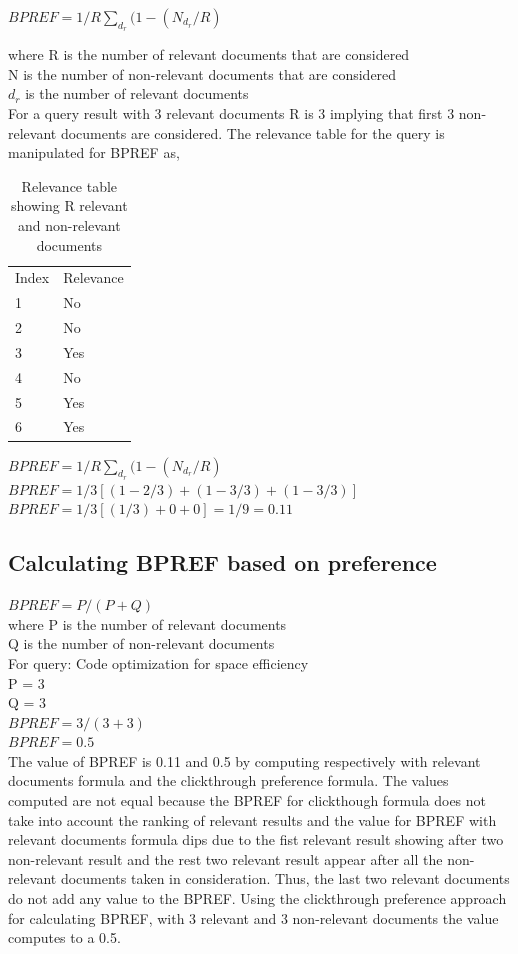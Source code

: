 \documentclass[12pt]{report}
\begin{document}
$BPREF = 1/R \sum\limits_{d_r}^{}(1- ({N_{d_r}} / R)$

where R is the number of relevant documents that are considered\\
N is the number of non-relevant documents that are considered\\
$d_r$ is the number of relevant documents\\
 
For a query result with 3 relevant documents R is 3 implying that first 3 non-relevant documents are considered. The relevance table for the query is manipulated for BPREF as,\\

\begin{table}[]
\centering
\caption{Relevance table showing R relevant and non-relevant documents}
\label{my-label}
\begin{tabular}{ll}
Index & Relevance \\
1     & No       \\
2     & No        \\
3     & Yes        \\
4     & No       \\
5     & Yes        \\
6     & Yes      

\end{tabular}
\end{table}
$BPREF = 1/R \sum\limits_{d_r}^{}(1- ({N_{d_r}} / R)$\\
$BPREF = 1/3[(1-2/3) + (1 - 3/3) + (1- 3/3)]$\\
$BPREF = 1/3 [(1/3) + 0 + 0] = 1/9 = 0.11$

\subsection{Calculating BPREF based on preference}

$BPREF = P /( P + Q)$\\
where P is the number of relevant documents \\
          Q is the number of non-relevant documents\\
For query: Code optimization for space efficiency\\
P = 3\\
Q = 3\\
$BPREF = 3/(3+3)$\\
$BPREF = 0.5$\\

The value of BPREF is 0.11 and 0.5 by computing respectively with relevant documents formula and the clickthrough preference formula. The values computed are not equal because the BPREF for clickthough formula does not take into account the ranking of relevant results and the value for BPREF with relevant documents formula dips due to the fist relevant result showing after two non-relevant result and the rest two relevant result appear after all the non-relevant documents taken in consideration. Thus, the last two relevant documents do not add any value to the BPREF. Using the clickthrough preference approach for calculating BPREF, with 3 relevant and 3  non-relevant documents the value computes to a 0.5.
\end{document}
